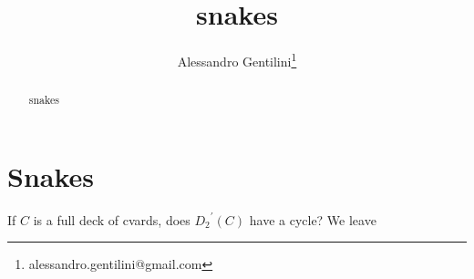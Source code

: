 \documentclass[a4paper,12pt]{article}
\title{snakes}
\author{Alessandro Gentilini\thanks{alessandro.gentilini@gmail.com}}
\begin{document}
\maketitle

\begin{abstract}
snakes
\end{abstract} 

\section{Snakes}


If $C$ is a full deck of cvards, does ${D_{2}}^{'}(C)$ have a cycle? We leave 
\end{document}
